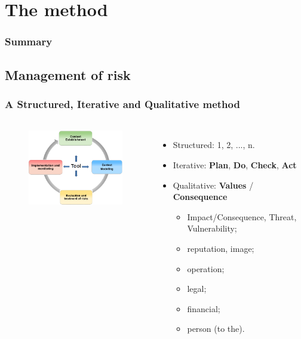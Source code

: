 
%
%
\section{The method}
\begin{frame}
    \frametitle{Summary}
\end{frame}


\subsection{Management of risk}
\begin{frame}
    \frametitle{A Structured, Iterative and Qualitative method}
    \framesubtitle{}
    \begin{columns}[t]
        \column{5.5cm}
        \begin{figure}
        \includegraphics[width=5.5cm]{./images/MONARC-method-1.png}
        \end{figure}
        \column{6.5cm}
        \begin{itemize}
                \item Structured: 1, 2, ..., n.
                \item Iterative: \textbf{Plan}, \textbf{Do}, \textbf{Check}, \textbf{Act}
                \item Qualitative: \textbf{Values} / \textbf{Consequence}
                    \begin{itemize}
                        \item Impact/Consequence, Threat, Vulnerability;
                        \item reputation, image;
                        \item operation;
                        \item legal;
                        \item financial;
                        \item person (to the).
                    \end{itemize}
        \end{itemize}
        \end{columns}

\end{frame}

